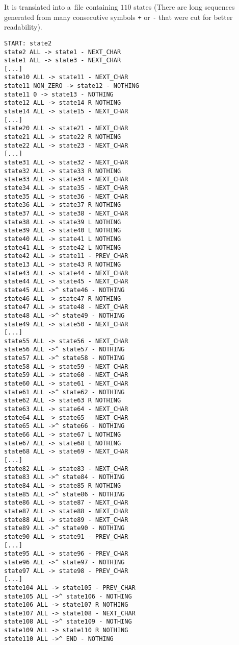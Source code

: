\documentclass[english,shortabstract,mgr]{iithesis}
\begin{document}
\newpage
It is translated into a~file containing $110$ states (There are long
sequences generated from many consecutive symbols \texttt{+} or \texttt{-} that
were cut for better readability).
\begin{multicols}{2}
\fontsize{9pt}{12pt}\selectfont
\begin{verbatim}
START: state2
state2 ALL -> state1 - NEXT_CHAR
state1 ALL -> state3 - NEXT_CHAR
[...]
state10 ALL -> state11 - NEXT_CHAR
state11 NON_ZERO -> state12 - NOTHING
state11 0 -> state13 - NOTHING
state12 ALL -> state14 R NOTHING
state14 ALL -> state15 - NEXT_CHAR
[...]
state20 ALL -> state21 - NEXT_CHAR
state21 ALL -> state22 R NOTHING
state22 ALL -> state23 - NEXT_CHAR
[...]
state31 ALL -> state32 - NEXT_CHAR
state32 ALL -> state33 R NOTHING
state33 ALL -> state34 - NEXT_CHAR
state34 ALL -> state35 - NEXT_CHAR
state35 ALL -> state36 - NEXT_CHAR
state36 ALL -> state37 R NOTHING
state37 ALL -> state38 - NEXT_CHAR
state38 ALL -> state39 L NOTHING
state39 ALL -> state40 L NOTHING
state40 ALL -> state41 L NOTHING
state41 ALL -> state42 L NOTHING
state42 ALL -> state11 - PREV_CHAR
state13 ALL -> state43 R NOTHING
state43 ALL -> state44 - NEXT_CHAR
state44 ALL -> state45 - NEXT_CHAR
state45 ALL ->^ state46 - NOTHING
state46 ALL -> state47 R NOTHING
state47 ALL -> state48 - NEXT_CHAR
state48 ALL ->^ state49 - NOTHING
state49 ALL -> state50 - NEXT_CHAR
[...]
state55 ALL -> state56 - NEXT_CHAR
state56 ALL ->^ state57 - NOTHING
state57 ALL ->^ state58 - NOTHING
state58 ALL -> state59 - NEXT_CHAR
state59 ALL -> state60 - NEXT_CHAR
state60 ALL -> state61 - NEXT_CHAR
state61 ALL ->^ state62 - NOTHING
state62 ALL -> state63 R NOTHING
state63 ALL -> state64 - NEXT_CHAR
state64 ALL -> state65 - NEXT_CHAR
state65 ALL ->^ state66 - NOTHING
state66 ALL -> state67 L NOTHING
state67 ALL -> state68 L NOTHING
state68 ALL -> state69 - NEXT_CHAR
[...]
state82 ALL -> state83 - NEXT_CHAR
state83 ALL ->^ state84 - NOTHING
state84 ALL -> state85 R NOTHING
state85 ALL ->^ state86 - NOTHING
state86 ALL -> state87 - NEXT_CHAR
state87 ALL -> state88 - NEXT_CHAR
state88 ALL -> state89 - NEXT_CHAR
state89 ALL ->^ state90 - NOTHING
state90 ALL -> state91 - PREV_CHAR
[...]
state95 ALL -> state96 - PREV_CHAR
state96 ALL ->^ state97 - NOTHING
state97 ALL -> state98 - PREV_CHAR
[...]
state104 ALL -> state105 - PREV_CHAR
state105 ALL ->^ state106 - NOTHING
state106 ALL -> state107 R NOTHING
state107 ALL -> state108 - NEXT_CHAR
state108 ALL ->^ state109 - NOTHING
state109 ALL -> state110 R NOTHING
state110 ALL ->^ END - NOTHING
\end{verbatim}
\end{multicols}
\end{document}
